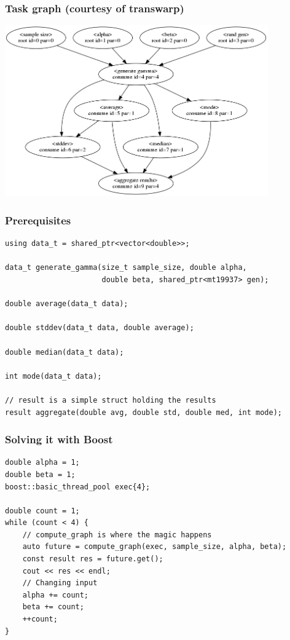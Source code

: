 \documentclass[12pt,aspectratio=169]{beamer}
\begin{document}
\begin{frame}[fragile]
\frametitle{Task graph (courtesy of transwarp)}
\begin{center}
\includegraphics[width=0.85\textwidth]{img/statistical_key_facts}
\end{center}
\end{frame}

\begin{frame}[fragile]
\frametitle{Prerequisites}
\begin{lstlisting}
using data_t = shared_ptr<vector<double>>;

data_t generate_gamma(size_t sample_size, double alpha, 
                      double beta, shared_ptr<mt19937> gen);

double average(data_t data);

double stddev(data_t data, double average);

double median(data_t data);

int mode(data_t data);

// result is a simple struct holding the results
result aggregate(double avg, double std, double med, int mode);
\end{lstlisting}
\end{frame}

\begin{frame}[fragile]
\frametitle{Solving it with Boost}
\begin{lstlisting}
double alpha = 1;
double beta = 1;
boost::basic_thread_pool exec{4};

double count = 1;
while (count < 4) {
    // compute_graph is where the magic happens
    auto future = compute_graph(exec, sample_size, alpha, beta);
    const result res = future.get();
    cout << res << endl;
    // Changing input
    alpha += count;
    beta += count;
    ++count;
}
\end{lstlisting}
\end{frame}
\end{document}
